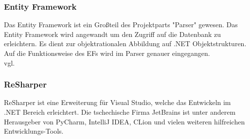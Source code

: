 \subsubsection {Entity Framework}
\label{sec:ef}
Das Entity Framework ist ein Großteil des Projektparts "Parser" gewesen. Das Entity Framework wird angewandt um den Zugriff auf die Datenbank zu erleichtern. Es dient zur objektrationalen Abbildung auf .NET Objektstrukturen. Auf die Funktionsweise des EFs wird im Parser genauer eingegangen. \\vgl. \cite{entityframework}
\subsubsection {ReSharper}
\label{sec:ReSharper}
ReSharper ist eine Erweiterung für Visual Studio, welche das Entwickeln im .NET Bereich erleichtert. Die tschechische Firma JetBrains ist unter anderem Herausgeber von PyCharm, IntelliJ IDEA,  CLion und vielen weiteren hilfreichen Entwicklungs-Tools. 

